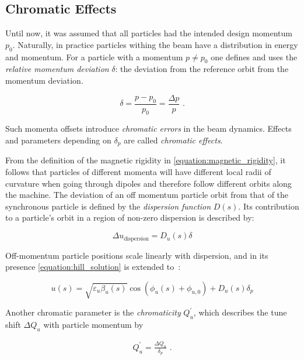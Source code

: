 \subsection{Chromatic Effects}

Until now, it was assumed that all particles had the intended design momentum \(p_{0}\).
Naturally, in practice particles withing the beam have a distribution in energy and momentum.
For a particle with a momentum \(p \neq p_{0}\) one defines and uses the \textit{relative momentum deviation} \(\delta\): the deviation from the reference orbit from the momentum deviation.

\begin{equation}
    \delta = \frac{p - p_{0}}{p_{0}} = \frac{\Delta p}{p} \text{ .}
    \label{equation:momentum_deviation}
\end{equation}

Such momenta offsets introduce \emph{chromatic errors} in the beam dynamics.
Effects and parameters depending on \(\delta_p\) are called \emph{chromatic effects}.

From the definition of the magnetic rigidity in \cref{equation:magnetic_rigidity}, it follows that particles of different momenta will have different local radii of curvature when going through dipoles and therefore follow different orbits along the machine.
The deviation of an off momentum particle orbit from that of the synchronous particle is defined by the \emph{dispersion function} $D(s)$.
Its contribution to a particle's orbit in a region of non-zero dispersion is described by:

\begin{equation}
    \Delta u_{\mathrm{dispersion}} = D_{u}(s) \delta 
    \label{equation:dispersion_contribution_to_orbit}
\end{equation}
\bigbreak

Off-momentum particle positions scale linearly with dispersion, and in its presence \cref{equation:hill_solution} is extended to~\cite{BOOK:Wiedemann:Particle_Accelerator_Physics}:

\begin{equation}
    u(s) = \sqrt{\varepsilon_u \beta_u(s)} \cos \left( \phi_u(s) + \phi_{u, 0} \right) + D_u(s) \delta_p
\end{equation}

Another chromatic parameter is the \emph{chromaticity} \(Q_u^{\prime}\), which describes the tune shift \(\Delta Q_u\) with particle momentum by

\begin{eqnarray}
    Q^{\prime}_u = \frac{\Delta Q_u}{\delta_p} \text{ .}
    \label{equation:chromaticity_definition}
\end{eqnarray}

